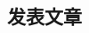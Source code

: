\documentclass[10pt,a4paper,sans]{moderncv}        %
\begin{document}
\begin{CJK*}{UTF8}{gbsn}


\section{发表文章}


\end{CJK*}
\end{document}

